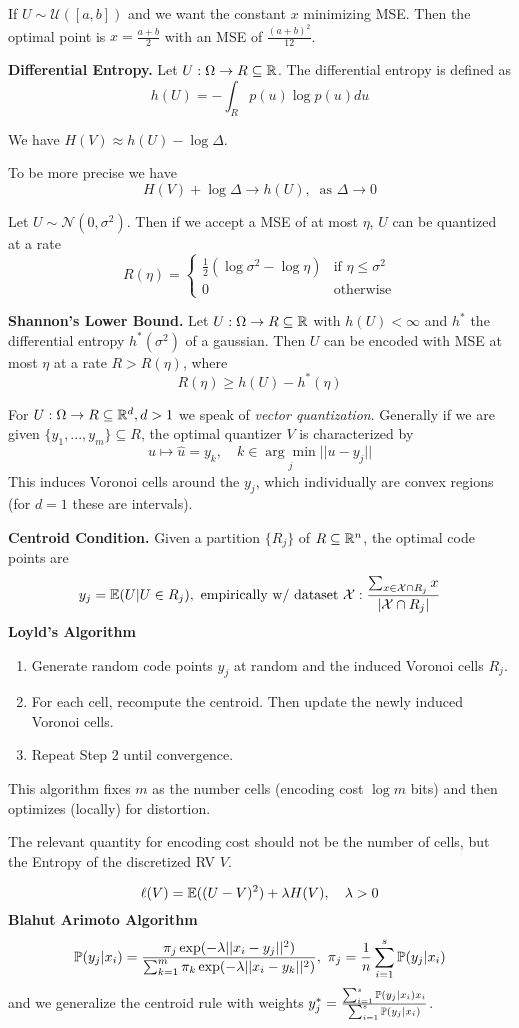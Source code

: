 If \(U \sim \mathcal{U}([a, b])\) and we want the constant \(x\) minimizing MSE. Then the optimal point is 
\(x = \frac{a+b}{2}\) with an MSE of \(\frac{(a+b)^2}{12}\).

\textbf{Differential Entropy.} Let \(U: \Omega \to R \subseteq \R\). The differential entropy is defined as
\[h(U) = - \int_{R}p(u) \log p(u) du\]

We have \(H(V) \approx h(U) - \log \Delta\).

To be more precise we have 
\[H(V) + \log \Delta \to h(U), \ \text{ as } \Delta \to 0\]

Let \(U \sim \mathcal{N}(0, \sigma^2)\). Then if we accept a MSE of at most \(\eta\), \(U\) can 
be quantized at a rate \[R(\eta) = \begin{cases}
    \frac{1}{2}(\log \sigma^2 - \log \eta) & \text{if } \eta \leq \sigma^2\\
    0 & \text{otherwise}
\end{cases}\]

\textbf{Shannon's Lower Bound.} Let \(U: \Omega \to R\subseteq \R\) with \(h(U) < \infty\) 
and \(h^*\) the differential entropy \(h^*(\sigma^2)\) of a gaussian. Then \(U\) can be encoded with 
MSE at most \(\eta\) at a rate \(R > R(\eta)\), where 
\[R(\eta) \geq h(U) - h^*(\eta)\]

For \(U: \Omega \to R \subseteq \R^d, d>1\) we speak of \textit{vector quantization}. 
Generally if we are given \(\{y_1, ..., y_m\} \subseteq R\), the optimal quantizer \(V\) is characterized by 
\[u \mapsto \hat{u} = y_k, \quad k \in \underset{j}{\arg \min} ||u - y_j||\]
This induces Voronoi cells around the \(y_j\), which individually are convex regions (for \(d = 1\) these are intervals).

\textbf{Centroid Condition.} Given a partition \(\{R_j\}\) of \(R \subseteq \R^n\), the optimal code points are 
\[y_j = \E(U | U \in R_j), \text{ empirically w/ dataset }\mathcal{X}: 
\frac{\sum_{x \in \mathcal{X}\cap R_j}x}{|\mathcal{X}\cap R_j|}\]
\textbf{Loyld's Algorithm}
\begin{enumerate}
    \item Generate random code points \(y_j\) at random and the induced Voronoi cells \(R_j\).
    \item For each cell, recompute the centroid. Then update the newly induced Voronoi cells.
    \item Repeat Step 2 until convergence.
\end{enumerate}
This algorithm fixes \(m\) as the number cells (encoding cost \(\log m\) bits) 
and then optimizes (locally) for distortion.

The relevant quantity for encoding cost should not be the number of cells, 
but the Entropy of the discretized RV \(V\).

\[\ell(V) = \E((U-V)^2) + \lambda H(V), \quad \lambda > 0\]
\textbf{Blahut Arimoto Algorithm} 
\[\P(y_j|x_i) = \frac{\pi_j \exp(-\lambda||x_i-y_j||^2)}{\sum_{k = 1}^m \pi_k \exp(-\lambda||x_i-y_k||^2)}, \ \pi_j = \frac{1}{n}\sum_{i = 1}^s \P(y_j|x_i)\]
and we generalize the centroid rule with weights \(y_j^* = \frac{\sum_{i = 1}^s \P(y_j|x_i)x_i}{\sum_{i = 1}^s \P(y_j|x_i)}\).
